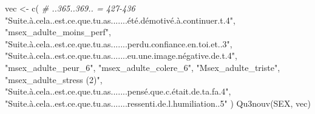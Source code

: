 \documentclass[
]{article}
\newenvironment{Shaded}{\begin{snugshade}}{\end{snugshade}}
\newcommand{\CommentTok}[1]{\textcolor[rgb]{0.56,0.35,0.01}{\textit{#1}}}
\newcommand{\FunctionTok}[1]{\textcolor[rgb]{0.00,0.00,0.00}{#1}}
\newcommand{\NormalTok}[1]{#1}
\newcommand{\OtherTok}[1]{\textcolor[rgb]{0.56,0.35,0.01}{#1}}
\newcommand{\StringTok}[1]{\textcolor[rgb]{0.31,0.60,0.02}{#1}}
\begin{document}
\begin{Shaded}
\begin{Highlighting}[]
\NormalTok{vec }\OtherTok{\textless{}{-}} \FunctionTok{c}\NormalTok{(  }\CommentTok{\# ..365..369.. = 427{-}436}
  \StringTok{"Suite.à.cela..est.ce.que.tu.as.......été.démotivé.à.continuer.t.4"}\NormalTok{,}
  \StringTok{"msex\_adulte\_moins\_perf"}\NormalTok{,}
  \StringTok{"Suite.à.cela..est.ce.que.tu.as.......perdu.confiance.en.toi.et..3"}\NormalTok{,}
  \StringTok{"Suite.à.cela..est.ce.que.tu.as.......eu.une.image.négative.de.t.4"}\NormalTok{,}
  \StringTok{"msex\_adulte\_peur\_6"}\NormalTok{,}
  \StringTok{"msex\_adulte\_colere\_6"}\NormalTok{,}
  \StringTok{"Msex\_adulte\_triste"}\NormalTok{,}
  \StringTok{"msex\_adulte\_stress (2)"}\NormalTok{,}
  \StringTok{"Suite.à.cela..est.ce.que.tu.as.......pensé.que.c.était.de.ta.fa.4"}\NormalTok{,}
  \StringTok{"Suite.à.cela..est.ce.que.tu.as.......ressenti.de.l.humiliation..5"}
\NormalTok{  )}
\FunctionTok{Qu3nouv}\NormalTok{(SEX, vec)}
\end{Highlighting}
\end{Shaded}
\end{document}
